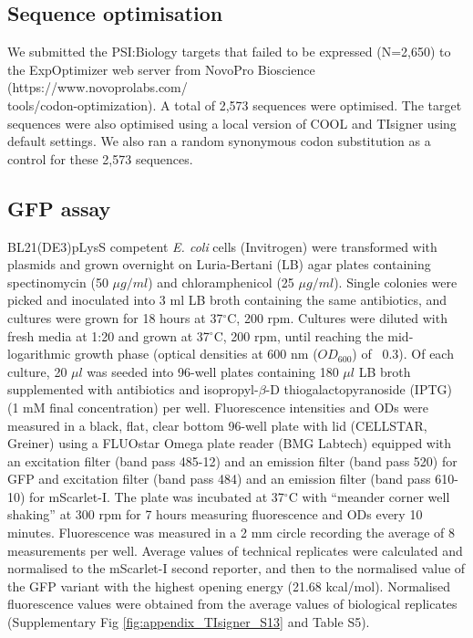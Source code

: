 \subsection{Sequence optimisation}
We submitted the PSI:Biology targets that failed to be expressed (N=2,650) to the ExpOptimizer web server from NovoPro Bioscience (https://www.novoprolabs.com/\\tools/codon-optimization). A total of 2,573 sequences were optimised. The target sequences were also optimised using a local version of COOL \cite{Chung2012-zh} and TIsigner using default settings. We also ran a random synonymous codon substitution as a control for these 2,573 sequences.

\subsection{GFP assay}
BL21(DE3)pLysS competent \textit{E. coli} cells (Invitrogen) were transformed with plasmids and grown overnight on Luria-Bertani (LB) agar plates containing spectinomycin (50 $\mu g/ml$) and chloramphenicol (25 $\mu g/ml$). Single colonies were picked and inoculated into 3 ml LB broth containing the same antibiotics, and cultures were grown for 18 hours at 37$^{\circ}$C, 200 rpm. Cultures were diluted with fresh media at 1:20 and grown at 37$^{\circ}$C, 200 rpm, until reaching the mid-logarithmic growth phase (optical densities at 600 nm ($OD_{600}$) of ~0.3). Of each culture, 20 $\mu l$ was seeded into 96-well plates containing 180 $\mu l$  LB broth supplemented with antibiotics and isopropyl-$\beta$-D thiogalactopyranoside (IPTG) (1 mM final concentration) per well. Fluorescence intensities and ODs were measured in a black, flat, clear bottom 96-well plate with lid (CELLSTAR, Greiner) using a FLUOstar Omega plate reader (BMG Labtech) equipped with an excitation filter (band pass 485-12) and an emission filter (band pass 520) for GFP and excitation filter (band pass 484) and an emission filter (band pass 610-10) for mScarlet-I. The plate was incubated at 37$^{\circ}$C with “meander corner well shaking” at 300 rpm for 7 hours measuring fluorescence and ODs every 10 minutes. Fluorescence was measured in a 2 mm circle recording the average of 8 measurements per well. Average values of technical replicates were calculated and normalised to the mScarlet-I second reporter, and then to the normalised value of the GFP variant with the highest opening energy (21.68 kcal/mol). Normalised fluorescence values were obtained from the average values of biological replicates (Supplementary Fig \ref{fig:appendix_TIsigner_S13} and Table S5).

